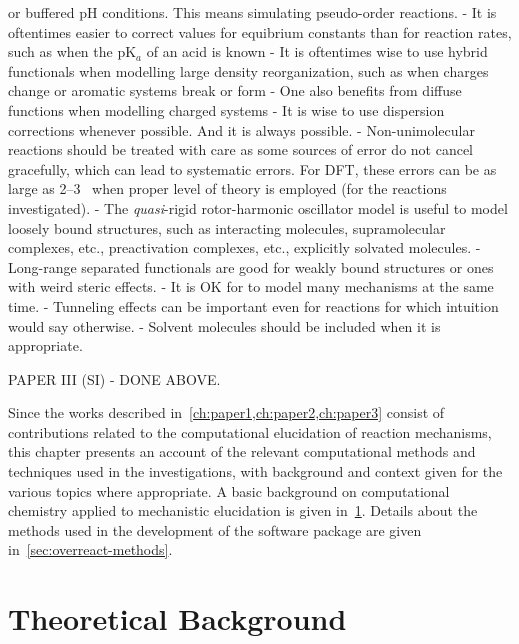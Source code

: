 or buffered pH conditions.
This means simulating pseudo-order reactions.
- It is oftentimes easier to correct values for equibrium constants than for reaction rates,
such as when the pK$_a$ of an acid is known
- It is oftentimes wise to use hybrid functionals when
modelling large density reorganization, such as when charges change or
aromatic systems break or form
- One also benefits from diffuse functions when modelling charged systems
- It is wise to use dispersion corrections whenever possible.
And it is always possible.
- Non-unimolecular reactions should be treated with care
as some sources of error do not cancel gracefully,
which can lead to systematic errors.
For DFT, these errors can be as large as 2--3~\kcalmol
when proper level of theory is employed (for the reactions investigated).
- The \emph{quasi}-rigid rotor-harmonic oscillator model
is useful to model loosely bound structures, such as
interacting molecules, supramolecular complexes, etc.,
preactivation complexes, etc., explicitly solvated molecules.
- Long-range separated functionals are good for weakly bound structures
or ones with weird steric effects.
- It is OK for \overreact{} to model many mechanisms at the same time.
- Tunneling effects can be important even for reactions for
which intuition would say otherwise.
- Solvent molecules should be included when it is appropriate.

PAPER III (SI)
- DONE ABOVE.\@



Since the works described in~\cref{ch:paper1,ch:paper2,ch:paper3} consist
of contributions related to the computational elucidation of reaction mechanisms,
this chapter presents an account of the relevant computational methods and
techniques used in the investigations,
with background and context given
for the various topics where appropriate.
A basic background on computational chemistry applied
to mechanistic elucidation is given in~\cref{sec:background-methods}.
Details about the methods used in the development of the \overreact software
package are given in~\cref{sec:overreact-methods}.

\section{Theoretical Background}%
\label{sec:background-methods}

